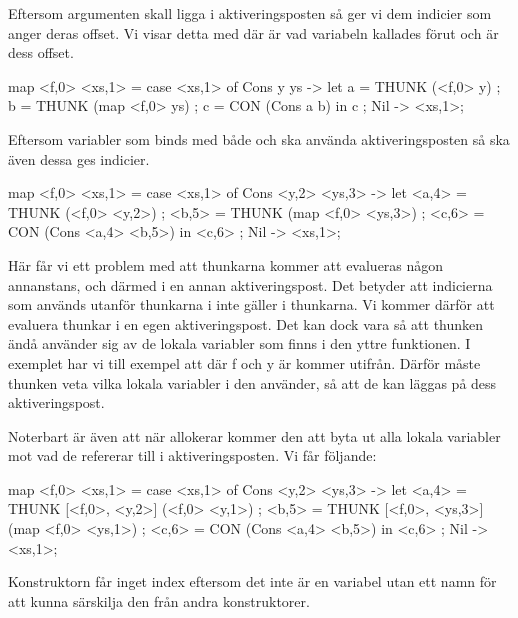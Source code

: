 \documentclass[../Core]{subfiles}
\begin{document}
Eftersom argumenten skall ligga i aktiveringsposten så ger vi dem indicier som anger deras 
offset. Vi visar detta med  där  är vad variabeln kallades 
förut och  är dess offset.

\begin{codeEx}
map <f,0> <xs,1> = case <xs,1> of
    { Cons y ys -> let
        { a = THUNK (<f,0> y)
        ; b = THUNK (map <f,0> ys)
        ; c = CON (Cons a b)
        } in c
    ; Nil -> <xs,1>};
\end{codeEx}

Eftersom variabler som binds med både  och  
ska använda aktiveringsposten så ska även dessa ges indicier.

\begin{codeEx}
map <f,0> <xs,1> = case <xs,1> of
    { Cons <y,2> <ys,3> -> let
        { <a,4> = THUNK (<f,0> <y,2>)
        ; <b,5> = THUNK (map <f,0> <ys,3>)
        ; <c,6> = CON (Cons <a,4> <b,5>)
        } in <c,6>
    ; Nil -> <xs,1>};
\end{codeEx}

Här får vi ett problem med att thunkarna kommer att evalueras någon 
annanstans, och därmed i en annan aktiveringspost. Det betyder att indicierna som 
används utanför thunkarna i  inte gäller i thunkarna. Vi kommer därför att evaluera
thunkar i en egen aktiveringspost. Det kan dock vara så att thunken ändå använder sig
av de lokala variabler som finns i den yttre funktionen. I exemplet har vi till exempel att 
 där f och y är kommer utifrån. Därför 
måste thunken veta vilka lokala variabler i  den använder, så att de kan
läggas på dess aktiveringspost. 

Noterbart är även att när  allokerar kommer den att byta ut alla lokala variabler
mot vad de refererar till i aktiveringsposten. Vi får följande: 


\begin{codeEx}
map <f,0> <xs,1> = case <xs,1> of
    { Cons <y,2> <ys,3> -> let
        { <a,4> = THUNK [<f,0>, <y,2>]  (<f,0> <y,1>)
        ; <b,5> = THUNK [<f,0>, <ys,3>] (map <f,0> <ys,1>)
        ; <c,6> = CON (Cons <a,4> <b,5>)
        } in <c,6>
    ; Nil -> <xs,1>};
\end{codeEx}

Konstruktorn  får inget index eftersom det inte är en variabel
utan ett namn för att kunna särskilja den från andra konstruktorer. 
\end{document}
